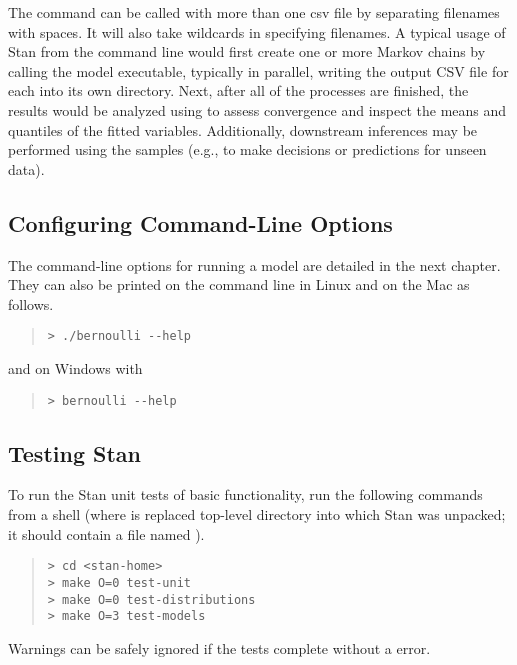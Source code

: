 The command  can be called with more than one csv file
by separating filenames with spaces. It will also take wildcards in
specifying filenames. A typical usage of Stan from the command line
would first create one or more Markov chains by calling the model
executable, typically in parallel, writing the output CSV file for
each into its own directory.  Next, after all of the processes are
finished, the results would be analyzed using  to assess
convergence and inspect the means and quantiles of the fitted
variables.  Additionally, downstream inferences may be performed using
the samples (e.g., to make decisions or predictions for unseen data).

\subsection{Configuring Command-Line Options}

The command-line options for running a model are detailed in
the next chapter. They can also be printed on the command
line in Linux and on the Mac as follows.
%
\begin{quote}
\begin{Verbatim}[fontshape=sl]
> ./bernoulli --help
\end{Verbatim}
\end{quote}
%
and on Windows with
%
\begin{quote}
\begin{Verbatim}[fontshape=sl]
> bernoulli --help
\end{Verbatim}
\end{quote}

\subsection{Testing Stan}

To run the Stan unit tests of basic functionality, run the
following commands from a shell (where  is replaced
top-level directory into which Stan was unpacked; it should contain a
file named ).
%
\begin{quote}
\begin{Verbatim}[fontshape=sl]
> cd <stan-home>
> make O=0 test-unit
> make O=0 test-distributions
> make O=3 test-models
\end{Verbatim}
\end{quote}
%
Warnings can be safely ignored if the tests complete without a
 error.

